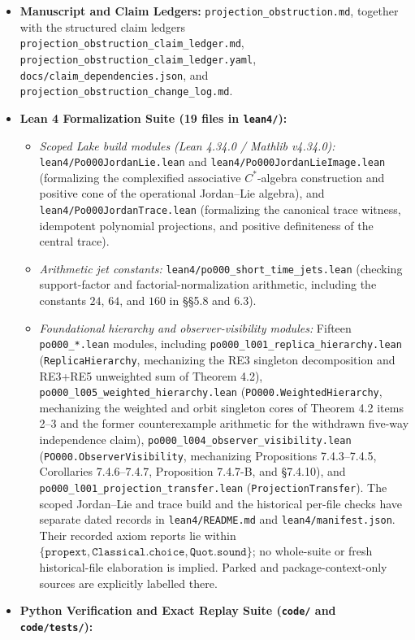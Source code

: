 \documentclass[
  11pt,
]{article}
\providecommand{\tightlist}{%
  \setlength{\itemsep}{0pt}\setlength{\parskip}{0pt}}
\providecommand{\tightlist}{%
  \setlength{\itemsep}{0pt}\setlength{\parskip}{0pt}}
\begin{document}
\begin{itemize}
\tightlist
\item
  \textbf{Manuscript and Claim Ledgers:} \texttt{projection\_obstruction.md}, together with the structured claim ledgers \texttt{projection\_obstruction\_claim\_ledger.md}, \texttt{projection\_obstruction\_claim\_ledger.yaml}, \texttt{docs/claim\_dependencies.json}, and \texttt{projection\_obstruction\_change\_log.md}.
\item
  \textbf{Lean 4 Formalization Suite (19 files in \texttt{lean4/}):}

  \begin{itemize}
  \tightlist
  \item
    \emph{Scoped Lake build modules (Lean 4.34.0 / Mathlib v4.34.0):} \texttt{lean4/Po000JordanLie.lean} and \texttt{lean4/Po000JordanLieImage.lean} (formalizing the complexified associative \(C^*\)-algebra construction and positive cone of the operational Jordan--Lie algebra), and \texttt{lean4/Po000JordanTrace.lean} (formalizing the canonical trace witness, idempotent polynomial projections, and positive definiteness of the central trace).
  \item
    \emph{Arithmetic jet constants:} \texttt{lean4/po000\_short\_time\_jets.lean} (checking support-factor and factorial-normalization arithmetic, including the constants \(24\), \(64\), and \(160\) in §§5.8 and 6.3).
  \item
    \emph{Foundational hierarchy and observer-visibility modules:} Fifteen \texttt{po000\_*.lean} modules, including \texttt{po000\_l001\_replica\_hierarchy.lean} (\texttt{ReplicaHierarchy}, mechanizing the RE3 singleton decomposition and RE3+RE5 unweighted sum of Theorem 4.2), \texttt{po000\_l005\_weighted\_hierarchy.lean} (\texttt{PO000.WeightedHierarchy}, mechanizing the weighted and orbit singleton cores of Theorem 4.2 items 2--3 and the former counterexample arithmetic for the withdrawn five-way independence claim), \texttt{po000\_l004\_observer\_visibility.lean} (\texttt{PO000.ObserverVisibility}, mechanizing Propositions 7.4.3--7.4.5, Corollaries 7.4.6--7.4.7, Proposition 7.4.7-B, and §7.4.10), and \texttt{po000\_l001\_projection\_transfer.lean} (\texttt{ProjectionTransfer}). The scoped Jordan--Lie and trace build and the historical per-file checks have separate dated records in \texttt{lean4/README.md} and \texttt{lean4/manifest.json}. Their recorded axiom reports lie within \(\{\texttt{propext},\texttt{Classical.choice},\texttt{Quot.sound}\}\); no whole-suite or fresh historical-file elaboration is implied. Parked and package-context-only sources are explicitly labelled there.
  \end{itemize}
\item
  \textbf{Python Verification and Exact Replay Suite (\texttt{code/} and \texttt{code/tests/}):}


\end{itemize}
\end{document}
